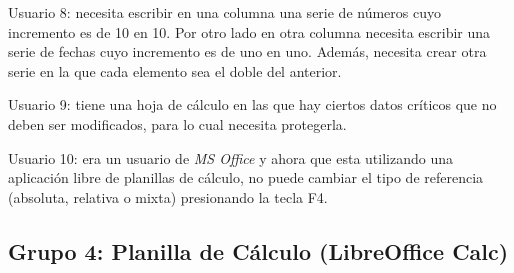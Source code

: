 \documentclass[12pt]{article}
\begin{document}
\begin{description}
    \item{Usuario 8}: necesita escribir en una columna una serie de números
    cuyo incremento es de 10 en 10. Por otro lado en otra columna necesita
    escribir una serie de fechas cuyo incremento es de uno en uno. Además,
    necesita crear otra serie en la que cada elemento sea el doble del
    anterior.

    \item{Usuario 9}: tiene una hoja de cálculo en las que hay ciertos datos
    críticos que no deben ser modificados, para lo cual necesita protegerla.

    \item{Usuario 10}: era un usuario de \emph{MS Office} y ahora que esta utilizando
    una aplicación libre de planillas de cálculo, no puede cambiar el tipo de
    referencia (absoluta, relativa o mixta) presionando la tecla F4.

\end{description}

\subsection*{Grupo 4: Planilla de Cálculo (LibreOffice Calc)}
\end{document}
